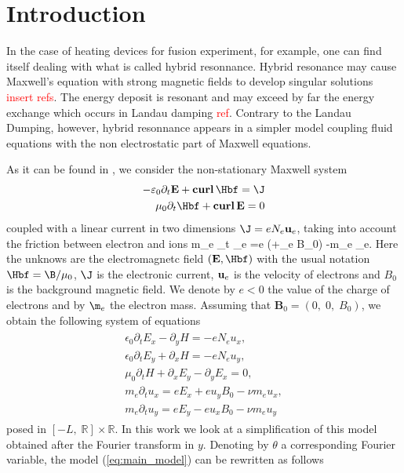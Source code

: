 
\section{Introduction}
In the case of heating devices for fusion experiment, for example, 
 one can find itself dealing with what is called hybrid resonnance. 
 Hybrid resonance may cause Maxwell's equation with strong magnetic 
 fields to develop singular solutions \textcolor{red}{insert refs}. 
 The energy deposit is resonant and may exceed by far the energy 
 exchange which occurs in Landau damping \textcolor{red}{ref}. 
 Contrary to the Landau Dumping, however, 
 hybrid resonnance appears in a simpler model coupling 
 fluid equations with the non electrostatic part of Maxwell equations.
 
 
 As it can be found in \cite{stable_yee_plasma_current}, we consider the non-stationary Maxwell system  
 \begin{align}
-\varepsilon_0 \partial_t \E + \curl\, \Hbf = \J\\
\mu_0 \partial_t \Hbf + \curl\, \E = 0
\end{align}
coupled with a linear current in two dimensions $\J = eN_e \ubf_e$, taking into account the friction between electron and ions
\be
m_e \partial_t \ubf_e =e (\E +\ubf_e \nabla B_0) -m_e \nu \ubf_e. \label{eq:electronmove}
\ee
Here the unknows are the electromagnetc field $(\E,\Hbf)$ with the usual notation $\Hbf = \B/\mu_0$, $\J$ is the electronic current, 
${\bf u}_e$ is the velocity of electrons and $B_0$ is the background magnetic field.  
We denote by $e<0$ the value of the charge of electrons and by $\m_e$ the electron mass.
Assuming that $\mathbf{B}_0=\left(0,\; 0,\; B_0\right)$, we obtain the following system of equations 
\begin{align}
\label{eq:main_model}
\begin{split}
\epsilon_0\partial_t E_{x}-\partial_y H=-eN_e u_x,\nonumber\\
\epsilon_0\partial_t E_{y}+\partial_x H=-eN_e u_y,\nonumber\\
\mu_0\partial_t H+\partial_x E_y-\partial_y E_x=0,\\
m_e\partial_t u_x=eE_x+eu_yB_0-\nu m_e u_x,\nonumber\\
m_e\partial_t u_y=eE_y-eu_xB_0-\nu m_e u_y\nonumber
\end{split}
\end{align}
posed in $[-L,\; \mathbb{R}]\times \mathbb{R}$. 
In this work we look at a simplification of this model obtained after 
the Fourier transform in $y$. Denoting by $\theta$ a corresponding Fourier variable, the model (\ref{eq:main_model}) can be rewritten as follows
